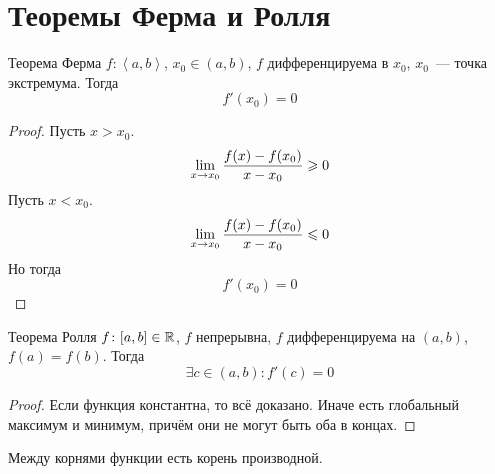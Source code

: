 ﻿\section{Теоремы Ферма и Ролля}
\begin{theorem}{Теорема Ферма}
$f\colon \left<a, b\right>$, $x_0 \in (a, b)$, $f$ дифференцируема в $x_0$, $x_0$~--- точка экстремума. Тогда
$$f'(x_0) = 0$$
\end{theorem}
\begin{proof}
Пусть $x > x_0$.
$$\lim_{x\rightarrow x_0} \frac{f(x) - f(x_0)}{x - x_0} \geqslant 0$$
Пусть $x < x_0$.
$$\lim_{x\rightarrow x_0} \frac{f(x) - f(x_0)}{x - x_0} \leqslant 0$$
Но тогда
$$f'(x_0) = 0$$
\end{proof}

\begin{theorem}{Теорема Ролля}
$f\colon [a, b] \in \mathbb{R}$, $f$ непрерывна, $f$ дифференцируема на $(a, b)$, $f(a) = f(b)$.
Тогда
$$\exists c\in(a, b)\colon f'(c) = 0$$
\end{theorem}
\begin{proof}
Если функция константна, то всё доказано. Иначе есть глобальный максимум и минимум, причём они не могут быть оба в концах.
\end{proof}

\begin{conseq}
Между корнями функции есть корень производной.
\end{conseq}
